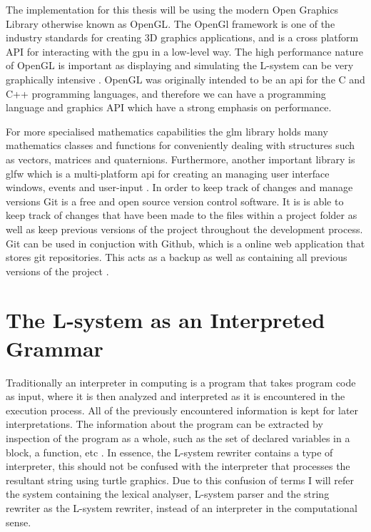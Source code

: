 The implementation for this thesis will be using the modern Open Graphics Library otherwise known as \gls{OpenGL}. The OpenGl framework is one of the industry standards for creating 3D graphics applications, and is a cross platform API for interacting with the \acrshort{gpu} in a low-level way. The high performance nature of OpenGL is important as displaying and simulating the L-system can be very graphically intensive \cite{sellers2013opengl} \cite{movania2017opengl}. OpenGL was originally intended to be an \acrshort{api} for the C and C++ programming languages, and therefore we can have a programming language and graphics API which have a strong emphasis on performance.

For more specialised mathematics capabilities the \acrfull{glm} library holds many mathematics classes and functions for conveniently dealing with structures such as vectors, matrices and quaternions. Furthermore, another important library is \acrfull{glfw} which is a multi-platform \acrshort{api} for creating an managing user interface windows, events and user-input \cite{glfwDocumentation}. In order to keep track of changes and manage versions Git is a free and open source version control software. It is is able to keep track of changes that have been made to the files within a project folder as well as keep previous versions of the project throughout the development process. Git can be used in conjuction with Github, which is a online web application that stores git repositories. This acts as a backup as well as containing all previous versions of the project \cite{torvalds}.

\section{The L-system as an Interpreted Grammar}

Traditionally an interpreter in computing is a program that takes program code as input, where it is then analyzed and interpreted as it is encountered in the execution process. All of the previously encountered information is kept for later interpretations. The information about the program can be extracted by inspection of the program as a whole, such as the set of declared variables in a block, a function, etc \cite{wilhelm2010compiler}. In essence, the L-system rewriter contains a type of interpreter, this should not be confused with the interpreter that processes the resultant string using turtle graphics. Due to this confusion of terms I will refer the system containing the lexical analyser, L-system parser and the string rewriter as the L-system rewriter, instead of an interpreter in the computational sense. 

